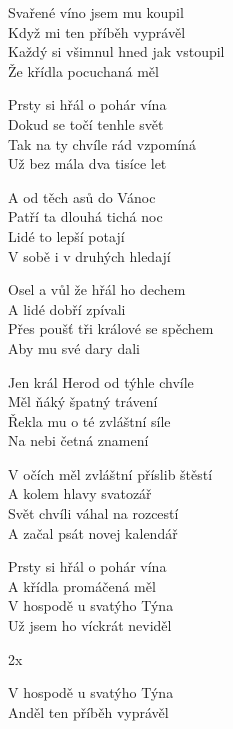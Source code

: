 
\ve{}
Svařené víno jsem mu koupil\\
Když mi ten příběh vyprávěl\\
Každý si všimnul hned jak vstoupil\\
Že křídla pocuchaná měl

\ve{}
Prsty si hřál o pohár vína\\
Dokud se točí tenhle svět\\
Tak na ty chvíle rád vzpomíná\\
Už bez mála dva tisíce let

\cho{}
A od těch asů do Vánoc\\
Patří ta dlouhá tichá noc\\
Lidé to lepší potají\\
V sobě i v druhých hledají

\ve{}
Osel a vůl že hřál ho dechem\\
A lidé dobří zpívali\\
Přes poušť tři králové se spěchem\\
Aby mu své dary dali

\ve{}
Jen král Herod od týhle chvíle\\
Měl ňáký špatný trávení\\
Řekla mu o té zvláštní síle\\
Na nebi četná znamení

\cho{}

V očích měl zvláštní příslib štěstí\\
A kolem hlavy svatozář\\
Svět chvíli váhal na rozcestí\\
A začal psát novej kalendář

\cho{}

Prsty si hřál o pohár vína\\
A křídla promáčená měl\\
V hospodě u svatýho Týna\\
Už jsem ho víckrát neviděl

 \cho{} 2x

V hospodě u svatýho Týna\\
Anděl ten příběh vyprávěl

\esong{}